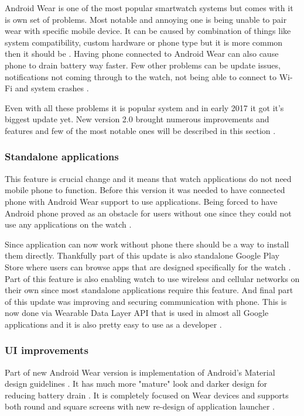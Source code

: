 Android Wear is one of the most popular smartwatch systems but comes with it is own set of problems. Most notable and annoying one is being unable to pair wear with specific mobile device. It can be caused by combination of things like system compatibility, custom hardware or phone type but it is more common then it should be \cite{AWPaS}. Having phone connected to Android Wear can also cause phone to drain battery way faster. Few other problems can be update issues, notifications not coming through to the watch, not being able to connect to Wi-Fi and system crashes \cite{WAWP}.

Even with all these problems it is popular system and in early 2017 it got it's biggest update yet. New version 2.0 brought numerous improvements and features and few of the most notable ones will be described in this section \cite{AW2UG, AW2WN, AW2N}.

\subsubsection{Standalone applications}\label{sec:StandaloneApplications}
This feature is crucial change and it means that watch applications do not need mobile phone to function. Before this version it was needed to have connected phone with Android Wear support to use applications. Being forced to have Android phone proved as an obstacle for users without one since they could not use any applications on the watch \cite{AW2UG, AW2WN}.

Since application can now work without phone there should be a way to install them directly. Thankfully part of this update is also standalone Google Play Store where users can browse apps that are designed specifically for the watch \cite{AW2WN}. Part of this feature is also enabling watch to use wireless and cellular networks on their own since most standalone applications require this feature. And final part of this update was improving and securing communication with phone. This is now done via Wearable Data Layer API that is used in almost all Google applications and it is also pretty easy to use as a developer \cite{AW2UG}. 

\subsubsection{UI improvements}\label{sec:UIImprovements}
Part of new Android Wear version is implementation of Android's Material design guidelines \cite{DoAW}. It has much more "mature" look and darker design for reducing battery drain \cite{AW2WN}. It is completely focused on Wear devices and supports both round and square screens with new re-design of application launcher \cite{AW2UG}.


